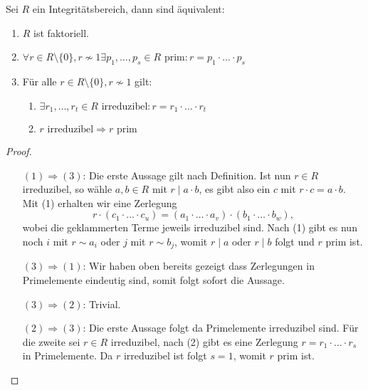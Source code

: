 \begin{proposition}
    Sei $R$ ein Integritätsbereich, dann sind äquivalent:
    \begin{enumerate}
        \item $R$ ist faktoriell.
        \item $ \forall r \in R \setminus \{0\}, r \not\sim 1 \exists p_1, \hdots, p_s \in R \text{ prim}: r = p_1 \cdot \hdots \cdot p_s $
        \item Für alle $ r \in R \setminus \{0\}, r \not\sim 1 $ gilt:
        \begin{enumerate}[label=\roman*.]
            \item $ \exists r_1, \hdots, r_t \in R \text{ irreduzibel}: r = r_1 \cdot \hdots \cdot r_t $
            \item $ r \text{ irreduzibel} \Rightarrow r \text{ prim} $
        \end{enumerate}
    \end{enumerate}
\end{proposition}


\begin{proof}{\ }
    \begin{itemize}[leftmargin=2.5cm]
        \item[$(1) \Rightarrow (3)$:] Die erste Aussage gilt nach Definition. Ist nun $r \in R$ irreduzibel, so wähle $a, b \in R$ mit $r \mid a \cdot b$, es gibt also ein $c$ mit $r \cdot c = a \cdot b$. Mit (1) erhalten wir eine Zerlegung $$ r \cdot (c_1 \cdot \hdots \cdot c_u) = (a_1 \cdot \hdots \cdot a_v) \cdot (b_1 \cdot \hdots \cdot b_w), $$ wobei die geklammerten Terme jeweils irreduzibel sind. Nach (1) gibt es nun noch $i$ mit $r \sim a_i$ oder $j$ mit  $r \sim b_j$, womit $r \mid a$ oder $r \mid b$ folgt und $r$ prim ist.

        \item[$(3) \Rightarrow (1)$:] Wir haben oben bereits gezeigt dass Zerlegungen in Primelemente eindeutig sind, somit folgt sofort die Aussage.
        
        \item[$(3) \Rightarrow (2)$:] Trivial.

        \item[$(2) \Rightarrow (3)$:] Die erste Aussage folgt da Primelemente irreduzibel sind. Für die zweite sei $r \in R$ irreduzibel, nach (2) gibt es eine Zerlegung $r = r_1 \cdot \hdots \cdot r_s$ in Primelemente. Da $r$ irreduzibel ist folgt $s = 1$, womit $r$ prim ist.
    \end{itemize}
\end{proof}

